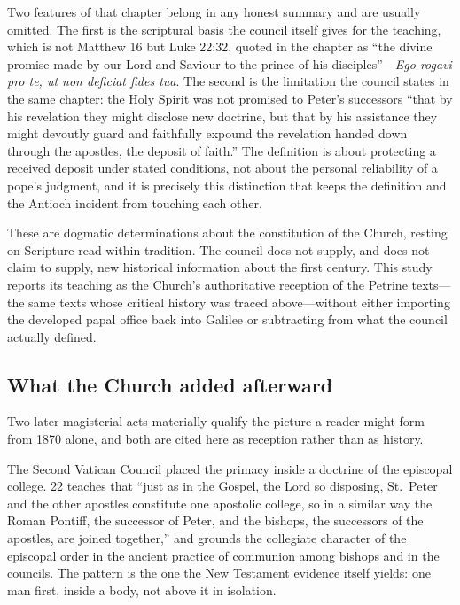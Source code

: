 Two features of that chapter belong in any honest summary and are usually
omitted. The first is the scriptural basis the council itself gives for the
teaching, which is not Matthew 16 but Luke 22:32, quoted in the chapter as
``the divine promise made by our Lord and Saviour to the prince of his
disciples''---\textit{Ego rogavi pro te, ut non deficiat fides tua}. The
second is the limitation the council states in the same chapter: the Holy
Spirit was not promised to Peter's successors ``that by his revelation they
might disclose new doctrine, but that by his assistance they might devoutly
guard and faithfully expound the revelation handed down through the apostles,
the deposit of faith.'' The definition is about protecting a received deposit
under stated conditions, not about the personal reliability of a pope's
judgment, and it is precisely this distinction that keeps the definition and
the Antioch incident from touching each other.

These are dogmatic determinations about the constitution of the Church,
resting on Scripture read within tradition. The council does not supply, and
does not claim to supply, new historical information about the first century.
This study reports its teaching as the Church's authoritative reception of
the Petrine texts---the same texts whose critical history was traced
above---without either importing the developed papal office back into Galilee
or subtracting from what the council actually defined.

\subsection{What the Church added afterward}

Two later magisterial acts materially qualify the picture a reader might form
from 1870 alone, and both are cited here as reception rather than as history.

The Second Vatican Council placed the primacy inside a doctrine of the
episcopal college.  22 teaches that ``just as in the
Gospel, the Lord so disposing, St.~Peter and the other apostles constitute one
apostolic college, so in a similar way the Roman Pontiff, the successor of
Peter, and the bishops, the successors of the apostles, are joined together,''
and grounds the collegiate character of the episcopal order in the ancient
practice of communion among bishops and in the councils. The pattern is the
one the New Testament evidence itself yields: one man first, inside a body,
not above it in isolation.

